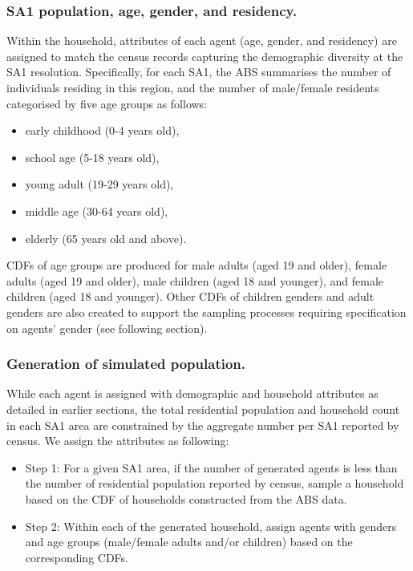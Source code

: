 \documentclass{article}
\begin{document}
\begin{appendices}
\subsubsection{SA1 population, age, gender, and residency.} 

Within the household, attributes of each agent  (age, gender, and residency) are assigned to match the census records capturing the demographic diversity at the SA1 resolution. Specifically, for each SA1, the ABS summarises the number of individuals residing in this region, and the number of male/female residents categorised by five age groups as follows:

\begin{itemize}
     \item early childhood (0-4 years old),
     \item school age (5-18 years old),
     \item young adult (19-29 years old),
     \item middle age (30-64 years old),
     \item elderly (65 years old and above).
\end{itemize}

CDFs of age groups are produced for male adults (aged 19 and older), female adults (aged 19 and older), male children (aged 18 and younger), and female children (aged 18 and younger). Other CDFs of children genders and adult genders are also created to support the sampling processes requiring specification on agents' gender (see following section).

\subsubsection{Generation of simulated population.}
While each agent is assigned with demographic and household attributes as detailed in earlier sections, the total residential population and household count in each SA1 area are constrained by the aggregate number per SA1 reported by census. We assign the attributes as following:

\begin{itemize}
    \item Step 1: For a given SA1 area, if the number of generated agents is less than the number of residential population reported by census, sample a household based on the CDF of households constructed from the ABS data.
    \item Step 2: Within each of the generated household, assign agents with genders and age groups (male/female adults and/or children) based on the corresponding CDFs. 
    \end{itemize}
    

\end{appendices}
\end{document}
